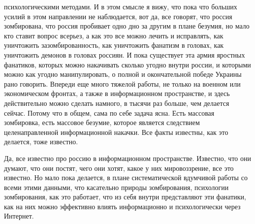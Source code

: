 психологическими методами. И в этом смысле я вижу, что пока что больших усилий
в этом направлении не наблюдается, вот да, все говорят, что россия зомбирована,
что россия пробивает одно дно за другим в плане безумия, но мало кто ставит
вопрос всерьез, а как это все можно лечить и исправлять, как уничтожить
зазомбированность, как уничтожить фанатизм в головах, как уничтожить демонов в
головах россиян. И пока существует эта армия яростных фанатиков, которых можно
накачивать сколько угодно внутри россии, и которыми можно как угодно
манипулировать, о полной и окончательной победе Украины рано говорить. Впереди
еще много тяжелой работы, не только на военном или экономическом фронтах, а
также в информационном пространстве, и здесь действительно можно сделать
намного, в тысячи раз больше, чем делается сейчас. Потому что в общем, сама по
себе задача ясна. Есть массовая зомбировка, есть массовое безумие, которое
является следствием целенаправленной информационной накачки. Все факты
известны, как это делается, тоже известно.

Да, все известно про россию в информационном пространстве. Известно, что они
думают, что они постят, чего они хотят, какое у них мировоззрение, все это
известно. Но мало пока делается, в плане систематической вдумчивой работы со
всеми этими данными, что касательно природы зомбирования, психологии
зомбирования, как это работает, что из себя внутри представляют эти фанатики,
как на них можно эффективно влиять информационно и психологически через
Интернет.
